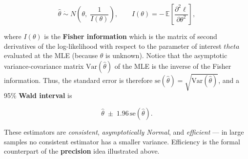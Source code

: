 \documentclass[
  letterpaper,
  DIV=11,
  numbers=noendperiod]{scrartcl}
\begin{document}
\[
\hat\theta \;\dot\sim\; N\!\left(\theta,\; \frac{1}{I(\theta)}\right),
\qquad
I(\theta) = -\,\mathbb{E}\!\left[\frac{\partial^2 \ell}{\partial\theta^2}\right],
\]

where \(I(\theta)\) is the \textbf{Fisher information} which is the
matrix of second derivatives of the log-likelihood with respect to the
parameter of interest \(theta\) evaluated at the MLE (because \(\theta\)
is unknown). Notice that the asymptotic variance-covariance matrix
\(\text{Var}(\hat\theta)\) of the MLE is the inverse of the Fisher
information. Thus, the standard error is therefore
\(\text{se}(\hat\theta) = \sqrt{\text{Var}(\hat\theta)}\), and a 95\%
\textbf{Wald interval} is

\[
\hat\theta \;\pm\; 1.96\,\text{se}(\hat\theta).
\]

These estimators are \emph{consistent}, \emph{asymptotically Normal},
and \emph{efficient} --- in large samples no consistent estimator has a
smaller variance. Efficiency is the formal counterpart of the
\textbf{precision} idea illustrated above.
\end{document}
